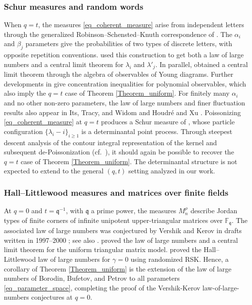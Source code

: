 \documentclass[11pt,reqno]{amsart}
\theoremstyle{definition}
\theoremstyle{remark}
\numberwithin{equation}{section}
\begin{document}
\subsubsection{Schur measures and random words}
When $q=t$, the measures \eqref{eq_coherent_measure} arise from independent
letters through the generalized Robinson--Schensted--Knuth correspondence
of \cite{KV86}. The $\alpha_i$ and $\beta_j$ parameters give
the probabilities of two types of discrete letters, with opposite
repetition conventions. \cite[Theorem~2]{Buf12} used this construction to get both
a law of large numbers and a central limit theorem for $\lambda_i$ and $\lambda'_j$.
In parallel, \cite{Mel12} obtained a central limit theorem through
the algebra of observables of Young diagrams. Further developments in \cite{FMN20} give concentration inequalities for polynomial observables, which also imply the $q=t$ case of Theorem \ref{Theorem_uniform}. For finitely many $\alpha_i$ and no other non-zero parameters, the law of large numbers
and finer fluctuation results also appear in Its, Tracy, and Widom
\cite[Section~3]{ITW01} and Houdr\'e and Xu \cite{HX13}.  Poissonizing \eqref{eq_coherent_measure} at $q=t$ produces a Schur measure of \cite{Oko01}, whose particle configuration $\{\lambda_i-i\}_{i\ge 1}$ is
a determinantal point process. Through steepest descent analysis of the contour integral
representation of the kernel and subsequent de-Poissonization  (cf.\ \cite{BOO00,Joh01}), it should
again be possible to recover the $q=t$ case of Theorem \ref{Theorem_uniform}. The determinantal structure is not expected to extend to the general $(q,t)$ setting analyzed in our work.


\subsubsection{Hall--Littlewood measures and matrices over finite fields}
At $q=0$ and $t=\mathfrak q^{-1}$, with $\mathfrak q$ a prime power,
the measures $M_n^\rho$ describe Jordan types of finite corners of
infinite unipotent upper-triangular matrices over $\mathbb F_{\mathfrak q}$.
The associated law of large numbers was conjectured by Vershik and Kerov
in drafts written in 1997--2000 \cite[Part~II, Section~4]{VK07}; see also
\cite[Conjecture~4.5]{GKV14}. \cite{Bor99} proved the law
of large numbers and a central limit theorem for the uniform triangular
matrix model. \cite{BP15} proved the Hall--Littlewood law of large numbers for $\gamma=0$ using randomized RSK. Hence, a corollary of Theorem \ref{Theorem_uniform}
is the extension of the law of large numbers of Borodin, Bufetov, and Petrov to all parameters \eqref{eq_parameter_space}, completing the
proof of the Vershik-Kerov law-of-large-numbers conjectures at $q=0$.
\end{document}
